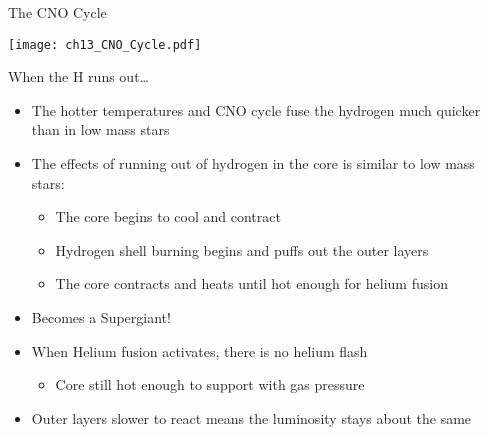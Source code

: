 \documentclass[pdf, aspectratio=169]{beamer}
\begin{document}
\begin{frame}{The CNO Cycle}
  \begin{center}
	\texttt{[image: ch13\_CNO\_Cycle.pdf]}
  \end{center}
\end{frame}

\begin{frame}{When the H runs out\ldots}
  \begin{itemize}
	\item The hotter temperatures and CNO cycle fuse the hydrogen much quicker than in low mass stars
	\item The effects of running out of hydrogen in the core is similar to low mass stars:
	  \begin{itemize}
		\item The core begins to cool and contract
		\item Hydrogen shell burning begins and puffs out the outer layers
		\item The core contracts and heats until hot enough for helium fusion
	  \end{itemize}
	\item Becomes a \alert{Supergiant!}
	\item When Helium fusion activates, there is no helium flash
	  \begin{itemize}
		\item Core still hot enough to support with gas pressure
	  \end{itemize}
	\item Outer layers slower to react means the luminosity stays about the same
  \end{itemize}
\end{frame}
\end{document}
